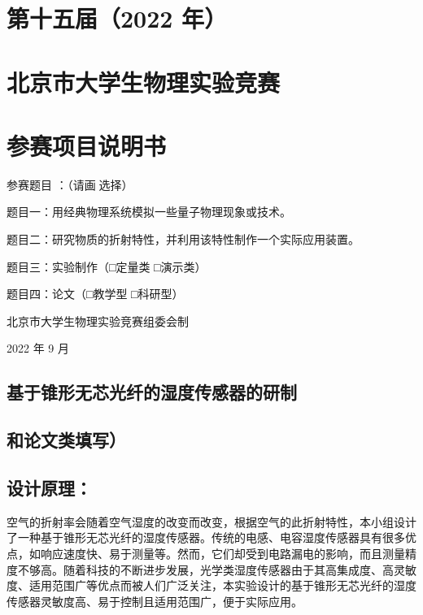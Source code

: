 \documentclass[
  10
]{article}
\author{}
\date{}
\begin{document}
\section{第十五届（2022 年）}\label{ux7b2cux5341ux4e94ux5c4a2022-ux5e74}

\section{北京市大学生物理实验竞赛}\label{ux5317ux4eacux5e02ux5927ux5b66ux751fux7269ux7406ux5b9eux9a8cux7adeux8d5b}

\section{参赛项目说明书}\label{ux53c2ux8d5bux9879ux76eeux8bf4ux660eux4e66}

参赛题目 ：（请画选择）

题目一：用经典物理系统模拟一些量子物理现象或技术。

题目二：研究物质的折射特性，并利用该特性制作一个实际应用装置。

题目三：实验制作（□定量类 □演示类）

题目四：论文（□教学型 □科研型）

北京市大学生物理实验竞赛组委会制

2022 年 9 月

\subsection{基于锥形无芯光纤的湿度传感器的研制}\label{ux57faux4e8eux9525ux5f62ux65e0ux82afux5149ux7ea4ux7684ux6e7fux5ea6ux4f20ux611fux5668ux7684ux7814ux5236}

\subsection{和论文类填写）}\label{ux548cux8bbaux6587ux7c7bux586bux5199}

\subsection{设计原理：}\label{ux8bbeux8ba1ux539fux7406}

空气的折射率会随着空气湿度的改变而改变，根据空气的此折射特性，本小组设计了一种基于锥形无芯光纤的湿度传感器。传统的电感、电容湿度传感器具有很多优点，如响应速度快、易于测量等。然而，它们却受到电路漏电的影响，而且测量精度不够高。随着科技的不断进步发展，光学类湿度传感器由于其高集成度、高灵敏度、适用范围广等优点而被人们广泛关注，本实验设计的基于锥形无芯光纤的湿度传感器灵敏度高、易于控制且适用范围广，便于实际应用。
\end{document}
